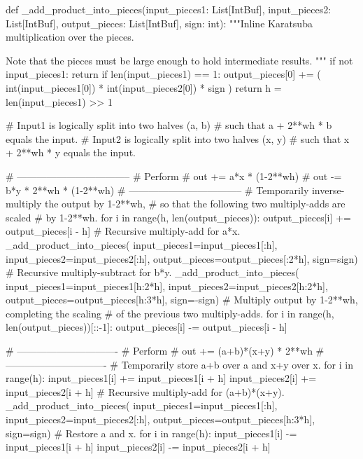 \documentclass[onecolumn]{quantumarticle}
\begin{document}
\begin{python}
def _add_product_into_pieces(input_pieces1: List[IntBuf],
                             input_pieces2: List[IntBuf],
                             output_pieces: List[IntBuf],
                             sign: int):
    """Inline Karatsuba multiplication over the pieces.

    Note that the pieces must be large enough to hold
    intermediate results.
    """
    if not input_pieces1:
        return
    if len(input_pieces1) == 1:
        output_pieces[0] += (
            int(input_pieces1[0]) *
            int(input_pieces2[0]) *
            sign
        )
        return
    h = len(input_pieces1) >> 1

    # Input1 is logically split into two halves (a, b)
    #   such that a + 2**wh * b equals the input.
    # Input2 is logically split into two halves (x, y)
    #   such that x + 2**wh * y equals the input.

    # -----------------------------------
    # Perform
    #     out += a*x * (1-2**wh)
    #     out -= b*y * 2**wh * (1-2**wh)
    # -----------------------------------
    # Temporarily inverse-multiply the output by 1-2**wh,
    # so that the following two multiply-adds are scaled
    # by 1-2**wh.
    for i in range(h, len(output_pieces)):
        output_pieces[i] += output_pieces[i - h]
    # Recursive multiply-add for a*x.
    _add_product_into_pieces(
        input_pieces1=input_pieces1[:h],
        input_pieces2=input_pieces2[:h],
        output_pieces=output_pieces[:2*h],
        sign=sign)
    # Recursive multiply-subtract for b*y.
    _add_product_into_pieces(
        input_pieces1=input_pieces1[h:2*h],
        input_pieces2=input_pieces2[h:2*h],
        output_pieces=output_pieces[h:3*h],
        sign=-sign)
    # Multiply output by 1-2**wh, completing the scaling
    # of the previous two multiply-adds.
    for i in range(h, len(output_pieces))[::-1]:
        output_pieces[i] -= output_pieces[i - h]

    # -------------------------------
    # Perform
    #     out += (a+b)*(x+y) * 2**wh
    # -------------------------------
    # Temporarily store a+b over a and x+y over x.
    for i in range(h):
        input_pieces1[i] += input_pieces1[i + h]
        input_pieces2[i] += input_pieces2[i + h]
    # Recursive multiply-add for (a+b)*(x+y).
    _add_product_into_pieces(
        input_pieces1=input_pieces1[:h],
        input_pieces2=input_pieces2[:h],
        output_pieces=output_pieces[h:3*h],
        sign=sign)
    # Restore a and x.
    for i in range(h):
        input_pieces1[i] -= input_pieces1[i + h]
        input_pieces2[i] -= input_pieces2[i + h]
\end{python}
\end{document}

